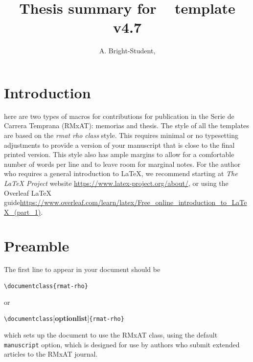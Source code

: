 \documentclass[10pt,letter,twoside]{rmat-rho}
\title{Thesis summary  for \rmaatex ~ template  v4.7}
\author[1,$\dagger$]{A. Bright-Student,}
\affil[1]{Universidad Nacional Autónoma de México, Instituto de Astronomía, AP 70-264, CDMX 04510, México}
\newcommand{\CS}[1]{\texttt{\textbackslash #1}}
\begin{document}
\maketitle
\pagestyle{fancy}
\thispagestyle{firststyle}




\section{Introduction}

here are two types of macros for contributions for publication in the Serie de Carrera Temprana (RMxAT): memorias and thesis. %
The style of all the templates are based on the \textit{rmat rho class} style. This requires minimal or no typesetting adjustments to provide a version of your manuscript that is close to the final printed version. This style also has ample margins to allow for a comfortable number of words per line and to leave room for marginal notes. %
For the author who requires a general introduction to \LaTeX{}, we recommend starting at {\it The LaTeX Project} website \url{https://www.latex-project.org/about/}, or using the Overleaf LaTeX guide\url{https://www.overleaf.com/learn/latex/Free_online_introduction_to_LaTeX_(part_1)}. 

\section{Preamble}

The first line to appear in your document should be 

\bigskip
\CS{documentclass}\verb+{rmat-rho}+

\bigskip
or

\bigskip
\CS{documentclass}[\textbf{optionlist}]\verb+{rmat-rho}+

\bigskip
\noindent which sets up the document to use the RMxAT class, using the default \texttt{manuscript} option, which is designed for use by authors who submit extended articles to the RMxAT journal. 
\end{document}

